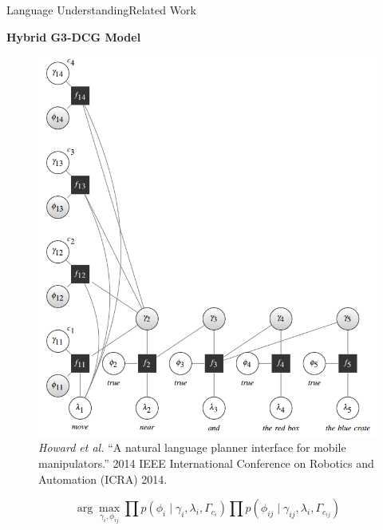 \begin{frame}{Language Understanding}{Related Work}

{\bf Hybrid G3-DCG Model }

\begin{figure}
	\centering
	\includegraphics[width=.35\linewidth]{figure/hybrid_G3_DCG}
	\caption{ \tiny{ {\it Howard et al.} ``A natural language planner interface for mobile manipulators.'' 2014 IEEE International Conference on Robotics and Automation (ICRA) 2014. } }
\end{figure}

	\begin{equation}
	\nonumber
	\arg \max_{ \gamma_i , \phi_{ij} } \prod p( \phi_i \mid \gamma_i , \lambda_i , \Gamma_{c_i}  ) \prod p( \phi_{ij} \mid \gamma_{ij} , \lambda_i,  \Gamma_{c_{ij}} ) 
	\end{equation}

\end{frame}